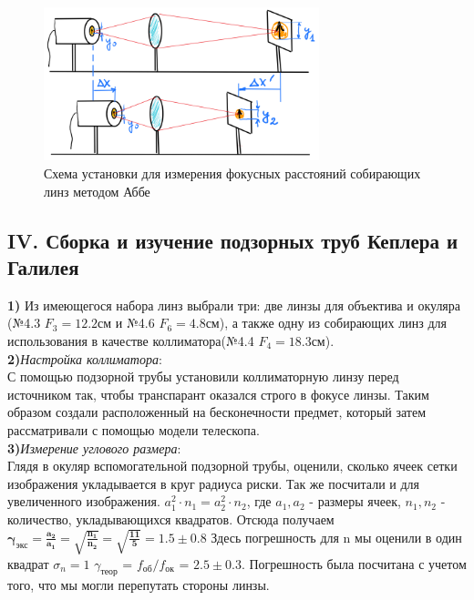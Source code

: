 \begin{figure}[h!]
    \centering
    \includegraphics[width=8cm]{images/setup3.png}
    \caption{Схема установки для измерения фокусных расстояний собирающих линз методом Аббе}
\end{figure}

\subsection*{IV. Сборка и изучение подзорных труб Кеплера и Галилея}
\textbf{1)} Из имеющегося набора линз выбрали три: две линзы для объектива и окуляра (№4.3 $F_3 = 12.2 $см и №4.6 $F_6 = 4.8 $см), а также одну из собирающих линз для использования в качестве коллиматора(№4.4 $F_4 = 18.3 $см).\\

\textbf{2)}\textit{Настройка коллиматора}: \\
С помощью подзорной трубы установили коллиматорную линзу перед источником так, чтобы транспарант оказался строго в фокусе линзы. Таким образом создали расположенный на бесконечности предмет, который затем рассматривали с помощью модели телескопа. \\

\textbf{3)}\textit{Измерение углового размера}: \\
Глядя в окуляр вспомогательной подзорной трубы, оценили, сколько ячеек сетки изображения укладывается в круг радиуса риски. Так же посчитали и для увеличенного изображения. $a_1^2 \cdot n_1 = a_2^2 \cdot n_2$, где $a_1, a_2$ - размеры ячеек, $n_1, n_2$ - количество, укладывающихся квадратов. Отсюда получаем $\bm{\gamma_{\text{экс}} = \frac{a_2}{a_1} = \sqrt{\frac{n_1}{n_2}} = \sqrt{\frac{11}{5}} = 1.5\pm0.8}$ Здесь погрешность для n мы оценили в один квадрат $\sigma_n = 1$  $\gamma_{\text{теор}}$ = $f_{\text{об}}/f_{\text{ок}}$ = $2.5 \pm 0.3$. Погрешность была посчитана с учетом того, что мы могли перепутать стороны линзы.\\

